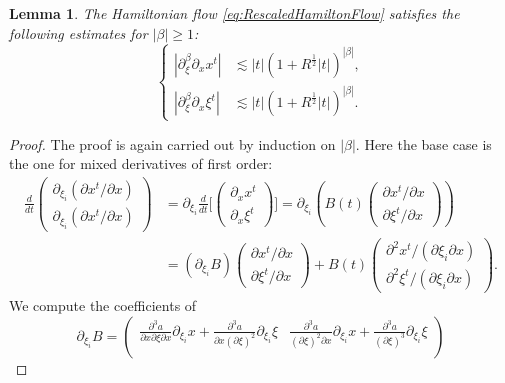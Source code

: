 \documentclass{amsart}
\newtheorem{lemma}[theorem]{Lemma}
\theoremstyle{definition}
\begin{document}
\begin{lemma}
\label{lem:HamiltonFlowMixedRegularityI}
The Hamiltonian flow \eqref{eq:RescaledHamiltonFlow} satisfies the following estimates for $|\beta| \geq 1$:
\begin{equation}
\label{eq:MixedRegularityI}
\left\{ \begin{array}{cl}
|\partial_{\xi}^{\beta} \partial_x x^t | &\lesssim |t| (1+ R^{\frac{1}{2}} |t|)^{|\beta|}, \\
|\partial_{\xi}^{\beta} \partial_x \xi^t| &\lesssim |t| (1+ R^{\frac{1}{2}} |t|)^{|\beta|}.
\end{array} \right.
\end{equation}
\end{lemma}
\begin{proof}
The proof is again carried out by induction on $|\beta|$. Here the base case is the one for mixed derivatives of first order:
\begin{equation*}
\begin{split}
\frac{d}{dt}  \begin{pmatrix}
\partial_{\xi_i} (\partial x^t / \partial x) \\
\partial_{\xi_i} (\partial x^t / \partial x)
\end{pmatrix} 
&=
\partial_{\xi_i} \frac{d}{dt} \big[ \begin{pmatrix}
\partial_{x} x^t \\ \partial_{x} \xi^t
\end{pmatrix}
\big] = \partial_{\xi_i} ( B(t) \begin{pmatrix}
\partial x^t / \partial x \\ \partial \xi^t / \partial x
\end{pmatrix}
) \\
&= (\partial_{\xi_i} B)
\begin{pmatrix}
\partial x^t / \partial x \\
\partial \xi^t / \partial x
\end{pmatrix}
+ B(t)
\begin{pmatrix}
\partial^2 x^t / (\partial \xi_i \partial x) \\
\partial^2 \xi^t / (\partial \xi_i \partial x)
\end{pmatrix}
.
\end{split}
\end{equation*}
We compute the coefficients of
\begin{equation*}
\partial_{\xi_i} B = \begin{pmatrix}
\frac{\partial^3 a}{\partial x \partial \xi \partial x} \partial_{\xi_i} x + \frac{\partial^3 a}{\partial x (\partial \xi)^2} \partial_{\xi_i} \xi & \frac{\partial^3 a}{(\partial \xi)^2 \partial x} \partial_{\xi_i} x + \frac{\partial^3 a}{(\partial \xi)^3} \partial_{\xi_i} \xi \\

\end{pmatrix}
\end{equation*}
\end{proof}
\end{document}

